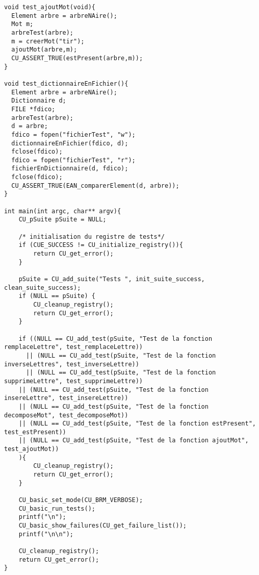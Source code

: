 \documentclass{report}
\begin{document}
\begin{lstlisting}
void test_ajoutMot(void){
  Element arbre = arbreNAire();
  Mot m;
  arbreTest(arbre);
  m = creerMot("tir");
  ajoutMot(arbre,m);
  CU_ASSERT_TRUE(estPresent(arbre,m));
}

void test_dictionnaireEnFichier(){
  Element arbre = arbreNAire();
  Dictionnaire d;
  FILE *fdico;
  arbreTest(arbre);
  d = arbre;
  fdico = fopen("fichierTest", "w");
  dictionnaireEnFichier(fdico, d);
  fclose(fdico);
  fdico = fopen("fichierTest", "r");
  fichierEnDictionnaire(d, fdico);
  fclose(fdico);
  CU_ASSERT_TRUE(EAN_comparerElement(d, arbre));
}

int main(int argc, char** argv){
    CU_pSuite pSuite = NULL;

    /* initialisation du registre de tests*/
    if (CUE_SUCCESS != CU_initialize_registry()){
        return CU_get_error();
    }

    pSuite = CU_add_suite("Tests ", init_suite_success, clean_suite_success);
    if (NULL == pSuite) {
        CU_cleanup_registry();
        return CU_get_error();
    }

    if ((NULL == CU_add_test(pSuite, "Test de la fonction remplaceLettre", test_remplaceLettre))
	  || (NULL == CU_add_test(pSuite, "Test de la fonction inverseLettres", test_inverseLettre))
	  || (NULL == CU_add_test(pSuite, "Test de la fonction supprimeLettre", test_supprimeLettre))
	|| (NULL == CU_add_test(pSuite, "Test de la fonction insereLettre", test_insereLettre))
	|| (NULL == CU_add_test(pSuite, "Test de la fonction decomposeMot", test_decomposeMot))
	|| (NULL == CU_add_test(pSuite, "Test de la fonction estPresent", test_estPresent))
	|| (NULL == CU_add_test(pSuite, "Test de la fonction ajoutMot", test_ajoutMot))
    ){
        CU_cleanup_registry();
        return CU_get_error();
    }

    CU_basic_set_mode(CU_BRM_VERBOSE);
    CU_basic_run_tests();
    printf("\n");
    CU_basic_show_failures(CU_get_failure_list());
    printf("\n\n");

    CU_cleanup_registry();
    return CU_get_error();
}


\end{lstlisting}
 
\end{document}
